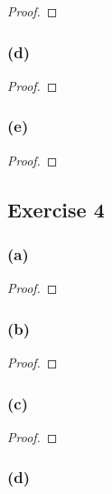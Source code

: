 \documentclass[14pt]{extarticle}
\begin{document}
\begin{proof}

\end{proof}

\subsubsection{(d)}

\begin{proof}

\end{proof}

\subsubsection{(e)}

\begin{proof}

\end{proof}

\subsection{Exercise 4}

\subsubsection{(a)}

\begin{proof}

\end{proof}

\subsubsection{(b)}

\begin{proof}

\end{proof}

\subsubsection{(c)}

\begin{proof}

\end{proof}

\subsubsection{(d)}
\end{document}

